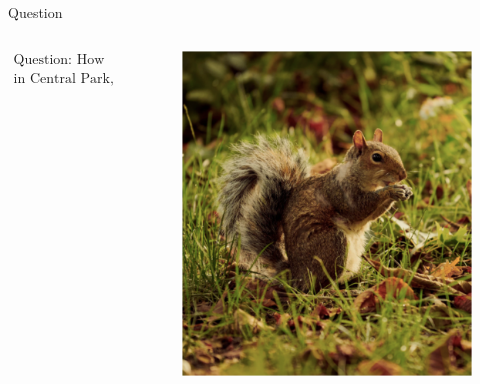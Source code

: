 \documentclass[aspectratio=169]{../latex_main/tntbeamer}  %
\begin{document}
	\begin{frame}{Question}
	    \begin{columns}
	        \begin{column}{.4\textwidth}
	        \bigskip
	        \bigskip
	        \bigskip
	        \bigskip
	         \centering
	            \begin{align*}
	                \text{Question: How many squirrels are there} \\
	                \text{in Central Park, New York City?}
	            \end{align*}
	       
	        \end{column}
	            
	        \begin{column}{.4\textwidth}
	            
	        \begin{figure}
	            \includegraphics[scale=.45]{Bild2}
	        \end{figure}
	            
	        \end{column}
	        
	        \end{columns}
	\end{frame}
	
\end{document}
